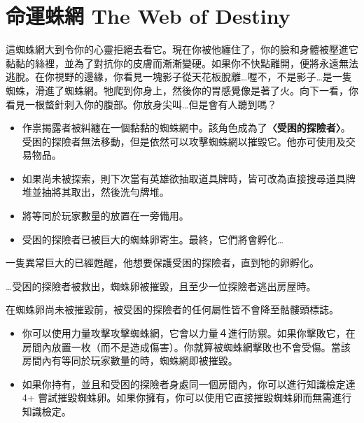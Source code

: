 
\chapter{命運蛛網 The Web of Destiny}

\begin{HauntStory}
	這蜘蛛網大到令你的心靈拒絕去看它。現在你被他纏住了，你的臉和身體被壓進它黏黏的絲裡，並為了對抗你的皮膚而漸漸變硬。如果你不快點離開，便將永遠無法逃脫。在你視野的邊緣，你看見一塊影子從天花板脫離…喔不，不是影子…是一隻蜘蛛，滑進了蜘蛛網。牠爬到你身上，然後你的胃感覺像是著了火。向下一看，你看見一根螫針刺入你的腹部。你放身尖叫…但是會有人聽到嗎？
\end{HauntStory}

\vspace*{-1em}
\begin{itemize}
	\item 作祟揭露者被糾纏在一個黏黏的蜘蛛網中。該角色成為了\textbf{〈受困的探險者〉}。受困的探險者無法移動，但是依然可以攻擊蜘蛛網以摧毀它。他亦可使用及交易物品。
	\item 如果尚未被探索，則下次當有英雄欲抽取道具牌時，皆可改為直接搜尋道具牌堆並抽將其取出，然後洗勻牌堆。
	\item 將等同於玩家數量的放置在一旁備用。
	\item 受困的探險者已被巨大的蜘蛛卵寄生。最終，它們將會孵化…
\end{itemize}

一隻異常巨大的已經甦醒，他想要保護受困的探險者，直到牠的卵孵化。

…受困的探險者被救出，蜘蛛卵被摧毀，且至少一位探險者逃出房屋時。

\vfill\null\pagebreak

在蜘蛛卵尚未被摧毀前，被受困的探險者的任何屬性皆不會降至骷髏頭標誌。
\begin{itemize}
	\item 你可以使用力量攻擊攻擊蜘蛛網，它會以力量４進行防禦。如果你擊敗它，在房間內放置一枚（而不是造成傷害）。你就算被蜘蛛網擊敗也不會受傷。當該房間內有等同於玩家數量的時，蜘蛛網即被摧毀。
	\item 如果你持有，並且和受困的探險者身處同一個房間內，你可以進行知識檢定達 4+ 嘗試摧毀蜘蛛卵。如果你擁有，你可以使用它直接摧毀蜘蛛卵而無需進行知識檢定。
\end{itemize}

